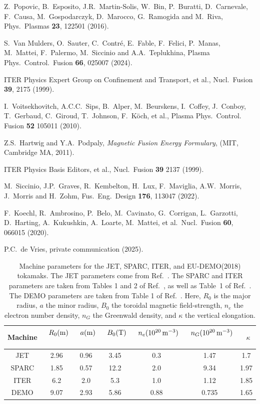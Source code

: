 \documentclass{iopjournal}
\begin{document}
\begin{thebibliography}{99}
 Z.~Popovic, B.~Esposito, J.R.~Martin-Solis, W.~Bin,  P.~Buratti, D.~Carnevale, F.~Causa, M.~Gospodarczyk,
D.~Marocco, G.~Ramogida and M.~Riva, Phys.\ Plasmas {\bf 23}, 122501 (2016). 

 S.~Van Mulders, O.~Sauter, C.~Contr\'{e}, E.~Fable, F.~Felici, P.~Manas, M.~Mattei, F.~Palermo, M.~Siccinio and A.A.~Teplukhina,
Plasma Phys.\ Control.\ Fusion {\bf 66}, 025007 (2024).

 ITER Physics Expert Group on Confinement and Transport, et al., Nucl.\ Fusion
{\bf 39},  2175 (1999). 

 I.~Voitsekhovitch, A.C.C.~Sips, B.~Alper, M.~Beurskens, I.~Coffey,
J.~Conboy, T.~Gerbaud, C.~Giroud, T.~Johnson, F.~K\"{o}ch, et al., Plasma Phys.\ Control. Fusion {\bf 52}  105011 (2010). 

 Z.S.~Hartwig and Y.A.~Podpaly, {\em Magnetic Fusion Energy Formulary}, (MIT, Cambridge MA, 2011).
 
 ITER Physics Basis Editors, et al., Nucl.\ Fusion {\bf 39} 2137 (1999). 

 M.~Siccinio, J.P.~Graves, R.~Kembelton, H.~Lux, F.~Maviglia, A.W.~Morris, J.~Morris and H.~Zohm, Fus.\ Eng.\ Design {\bf 176}, 113047 (2022). 

 F.~Koechl, R.~Ambrosino, P.~Belo, M.~Cavinato, G.~Corrigan, L.~Garzotti, D.~Harting, A.~Kukushkin, A.~Loarte, M.~Mattei,
et al.\ Nucl.\ Fusion {\bf 60}, 066015 (2020).

 P.C.~de Vries, private communication (2025).
 
\end{thebibliography}

\newpage 
\begin{table}
\begin{tabular}{ccccccc}\hline
Machine & ~$R_0({\rm m})$~ & ~$a({\rm m})$~ & ~$B_0({\rm T})$~ & ~$n_e(10^{20}\,{\rm m}^{-3})$~ & ~$n_G(10^{20}\,{\rm m}^{-3})$~&~$\kappa$\\ \hline
JET & 2.96 & 0.96 & 3.45 & 0.3& 1.47& 1.7\\[0.5ex]
SPARC & 1.85 & 0.57 & 12.2 & 2.0 & 9.34&1.97\\[0.5ex]
ITER & 6.2 & 2.0 & 5.3 & 1.0 &1.12& 1.85\\[0.5ex]
DEMO &9.07 & 2.93 & 5.86& 0.88 & 0.735& 1.65
\end{tabular}
\caption{Machine parameters for the JET, SPARC,  ITER, and EU-DEMO(2018) tokamaks. 
The JET parameters come from Ref.~\cite{jetx}. 
The SPARC and ITER parameters are taken from Tables 1 and 2 of Ref.~\cite{creely}, as well as Table~1 of Ref.~\cite{iter}. 
The DEMO parameters are taken from Table 1 of Ref.~\cite{demo}. 
Here, $R_0$ is the major radius, $a$ the minor radius, $B_0$ the toroidal magnetic field-strength, $n_e$ the electron number
density, $n_G$ the Greenwald density, and $\kappa$ the vertical elongation.}\label{t1}
\end{table}
\end{document}
